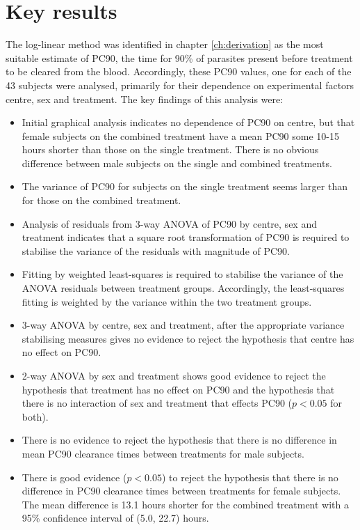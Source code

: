 \section{Key results}
The log-linear method was identified in chapter \ref{ch:derivation} as the most suitable estimate of PC90, the time for 90\% of parasites present before treatment to be cleared from the blood. Accordingly, these PC90 values, one for each of the 43 subjects were analysed, primarily for their dependence on experimental factors centre, sex and treatment. The key findings of this analysis were:
\begin{itemize}
\item Initial graphical analysis indicates no dependence of PC90 on centre, but that female subjects on the combined treatment have a mean PC90 some 10-15 hours shorter than those on the single treatment. There is no obvious difference between male subjects on the single and combined treatments.
\item The variance of PC90 for subjects on the single treatment seems larger than for those on the combined treatment.
\item Analysis of residuals from 3-way ANOVA of PC90 by centre, sex and treatment indicates that a square root transformation of PC90 is required to stabilise the variance of the residuals with magnitude of PC90.
\item Fitting by weighted least-squares is required to stabilise the variance of the ANOVA residuals between treatment groups. Accordingly, the least-squares fitting is weighted by the variance within the two treatment groups. 
\item 3-way ANOVA by centre, sex and treatment, after the appropriate variance stabilising measures gives no evidence to reject the hypothesis that centre has no effect on PC90.
\item 2-way ANOVA by sex and treatment shows good evidence to reject the hypothesis that treatment has no effect on PC90 and the hypothesis that there is no interaction of sex and treatment that effects PC90 ($p<0.05$ for both).
\item There is no evidence to reject the hypothesis that there is no difference in mean PC90 clearance times between treatments for male subjects.
\item There is good evidence ($p<0.05$) to reject the hypothesis that there is no difference in PC90 clearance times between treatments for female subjects. The mean difference is 13.1 hours shorter for the combined treatment with a 95\% confidence interval of (5.0, 22.7) hours.

\end{itemize}
